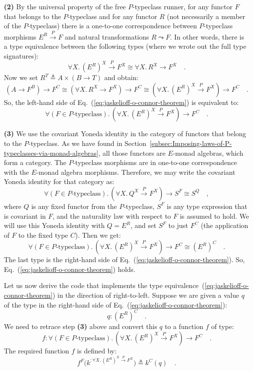 \textbf{(2)} By the universal property of the free $P$-typeclass
runner, for any functor $F$ that belongs to the $P$-typeclass and
for any functor $R$ (not necessarily a member of the $P$-typeclass)
there is a one-to-one correspondence between $P$-typeclass morphisms
$E^{R}\overset{P}{\rightarrow}F$ and natural transformations $R\leadsto F$.
In other words, there is a type equivalence between the following
types (where we wrote out the full type signatures): 
\[
\forall X.\,(E^{R})^{X}\overset{P}{\rightarrow}F^{X}\cong\forall X.\,R^{X}\rightarrow F^{X}\quad.
\]
Now we set $R^{T}\triangleq A\times(B\rightarrow T)$ and obtain:
\[
(A\rightarrow F^{B})\rightarrow F^{C}\cong(\forall X.\,R^{X}\rightarrow F^{X})\rightarrow F^{C}\cong(\forall X.\,(E^{R})^{X}\overset{P}{\rightarrow}F^{X})\rightarrow F^{C}\quad.
\]
So, the left-hand side of Eq.~(\ref{eq:jaskelioff-o-connor-theorem})
is equivalent to:
\[
\forall(F\in P\text{-typeclass}).\,(\forall X.\,(E^{R})^{X}\overset{P}{\rightarrow}F^{X})\rightarrow F^{C}\quad.
\]

\textbf{(3)} We use the covariant Yoneda identity in the category
of functors that belong to the $P$-typeclass. As we have found in
Section~\ref{subsec:Imposing-laws-of-P-typeclasses-via-monad-algebras},
all those functors are $E$-monad algebras, which form a category.
The $P$-typeclass morphisms are in one-to-one correspondence with
the $E$-monad algebra morphisms. Therefore, we may write the covariant
Yoneda identity for that category as:
\[
\forall(F\in P\text{-typeclass}).\,(\forall X.\,Q^{X}\overset{P}{\rightarrow}F^{X})\rightarrow S^{F}\cong S^{Q}\quad,
\]
where $Q$ is any fixed functor from the $P$-typeclass, $S^{F}$
is any type expression that is covariant in $F$, and the naturality
law with respect to $F$ is assumed to hold. We will use this Yoneda
identity with $Q=E^{R}$, and set $S^{F}$ to just $F^{C}$ (the application
of $F$ to the fixed type $C$). Then we get:
\[
\forall(F\in P\text{-typeclass}).\,(\forall X.\,(E^{R})^{X}\overset{P}{\rightarrow}F^{X})\rightarrow F^{C}\cong(E^{R})^{C}\quad.
\]
The last type is the right-hand side of Eq.~(\ref{eq:jaskelioff-o-connor-theorem}).
So, Eq.~(\ref{eq:jaskelioff-o-connor-theorem}) holds.

Let us now derive the code that implements the type equivalence~(\ref{eq:jaskelioff-o-connor-theorem})
in the direction of right-to-left. Suppose we are given a value $q$
of the type in the right-hand side of Eq.~(\ref{eq:jaskelioff-o-connor-theorem}):
\[
q:(E^{R})^{C}\quad.
\]
We need to retrace step \textbf{(3)} above and convert this $q$ to
a function $f$ of type:
\[
f:\forall(F\in P\text{-typeclass}).\,(\forall X.\,(E^{R})^{X}\overset{P}{\rightarrow}F^{X})\rightarrow F^{C}\quad.
\]
The required function $f$ is defined by:
\[
f^{F}\big(k^{:\forall X.\,(E^{R})^{X}\overset{P}{\rightarrow}F^{X}}\big)\triangleq k^{C}(q)\quad.
\]

